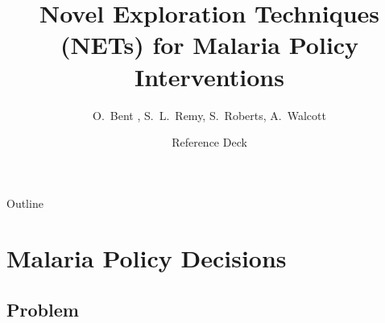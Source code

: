 \documentclass{beamer}
\title{Novel Exploration Techniques (NETs) for Malaria Policy Interventions}
\author{O.~Bent\inst{1} \inst{2},  S.~L.~Remy\inst{2}, S.~Roberts\inst{1}, A.~Walcott\inst{2}}%
\institute[Universities of Somewhere and Elsewhere] %
{
  \inst{1}%
  Department of Engineering Science\\
  University of Oxford
  \and
  \inst{2}%
  IBM Research Africa\\
  Nairobi, Kenya}
\date{Reference Deck}
\begin{document}
\begin{frame}
  \titlepage
\end{frame}

\begin{frame}{Outline}
  \tableofcontents
\end{frame}

\section{Malaria Policy Decisions}

\subsection{Problem}
\end{document}
